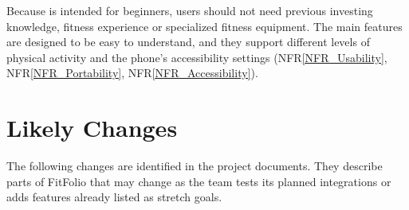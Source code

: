\documentclass[12pt]{article}
\newcommand{\nfrref}[1]{NFR\ref{#1}}
\begin{document}
Because \progname{} is intended for beginners, users should not need previous
investing knowledge, fitness experience or specialized fitness equipment. The
main features are designed to be easy to understand, and they support
different levels of physical activity and the phone's accessibility settings
(\nfrref{NFR_Usability}, \nfrref{NFR_Portability},
\nfrref{NFR_Accessibility}).

\section{Likely Changes} 

The following changes are identified in the project documents. They describe parts of FitFolio that may change as the team tests its planned integrations or adds features already listed as stretch goals.
\end{document}
